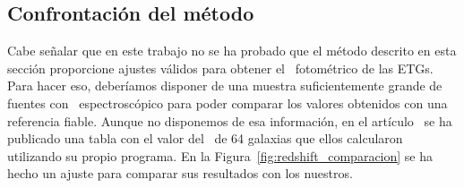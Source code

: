 \subsection{Confrontación del método}

Cabe señalar que en este trabajo no se ha probado que el método descrito en esta sección proporcione ajustes válidos para obtener el \rt\ fotométrico de las ETGs. Para hacer eso, deberíamos disponer de una muestra suficientemente grande de fuentes con \rt\ espectroscópico para poder comparar los valores obtenidos con una referencia fiable. Aunque no disponemos de esa información, en el artículo~\cite{article:Nuevo_2012} se ha publicado una tabla con el valor del \rt\ de 64 galaxias que ellos calcularon utilizando su propio programa. En la Figura~\ref{fig:redshift_comparacion} se ha hecho un ajuste para comparar sus resultados con los nuestros.  

\vspace*{-15mm}

